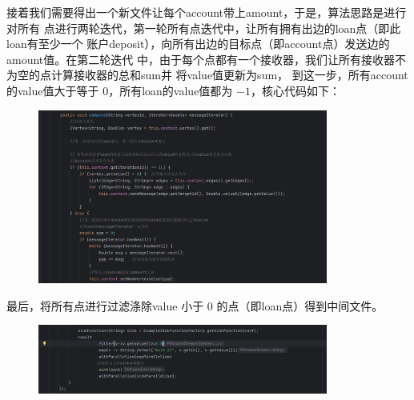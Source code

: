 接着我们需要得出一个新文件让每个account带上amount，于是，算法思路是进行对所有
点进行两轮迭代，第一轮所有点迭代中，让所有拥有出边的loan点（即此loan有至少一个
账户deposit），向所有出边的目标点（即account点）发送边的amount值。在第二轮迭代
中，由于每个点都有一个接收器，我们让所有接收器不为空的点计算接收器的总和sum并
将value值更新为sum，
到这一步，所有account的value值大于等于 $ 0 $，所有loan的value值都为 $ -1 $，核心代码如下：
\begin{figure}[H]
  \begin{center}
    \includegraphics[width=0.85\textwidth,scale=0.7]{./figures/pro4/2.png}
  \end{center}
\end{figure}

最后，将所有点进行过滤涤除value 小于 $ 0 $ 的点（即loan点）得到中间文件。
\begin{figure}[H]
  \begin{center}
    \includegraphics[width=0.85\textwidth,scale=0.7]{./figures/pro4/3.png}
  \end{center}
\end{figure}

